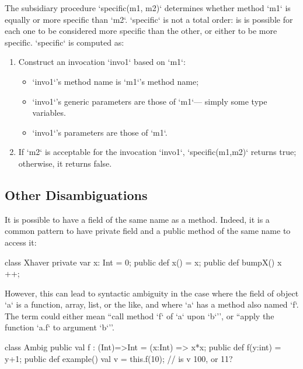 The subsidiary procedure \xcd`specific(m1, m2)` determines whether method
\xcd`m1` is equally or more specific than \xcd`m2`.  \xcd`specific` is not a
total order: is is possible for each one to be considered more specific than
the other, or either to be more specific.  \xcd`specific` is computed as: 
\begin{enumerate}
\item Construct an invocation \xcd`invo1` based on \xcd`m1`: 
      \begin{itemize}
      \item \xcd`invo1`'s method name is \xcd`m1`'s method name;
      \item \xcd`invo1`'s generic parameters are those of \xcd`m1`--- simply
            some type variables.
      \item \xcd`invo1`'s parameters are those of \xcd`m1`.
      \end{itemize}
\item If \xcd`m2` is acceptable for the invocation \xcd`invo1`,
      \xcd`specific(m1,m2)` returns true; otherwise, it returns false.
\end{enumerate}

\subsection{Other Disambiguations}

It is possible to have a field of the same name as a method.
Indeed, it is a common pattern to have private field and a public
method of the same name to access it:
\begin{ex}
\begin{xten}
class Xhaver {
  private var x: Int = 0;
  public def x() = x;
  public def bumpX() { x ++; }
}
\end{xten}
%
\end{ex}

\begin{ex}
However, this can lead to syntactic ambiguity in the case where the field
 of object \xcd`a` is a
function, array, list, or the like, and where \xcd`a` has a method also named
\xcd`f`.  The term  could either mean ``call method \xcd`f` of \xcd`a` upon
\xcd`b`'', or ``apply the function \xcd`a.f` to argument \xcd`b`''.  

\begin{xten}
class Ambig {
  public val f : (Int)=>Int =  (x:Int) => x*x;
  public def f(y:int) = y+1;
  public def example() {
      val v = this.f(10);
      // is v 100, or 11?
  }
}
\end{xten}
%
\end{ex}

